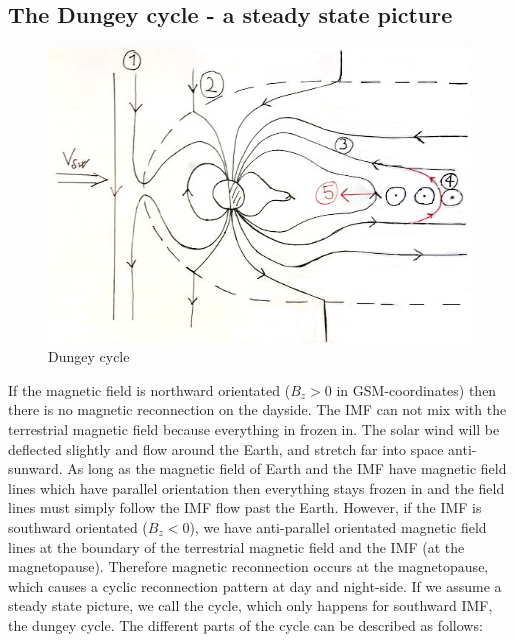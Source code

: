\documentclass[10pt,a4paper]{article}
\begin{document}
\subsection{The Dungey cycle - a steady state picture \label{_CHAP_THEO_Dungey cycle}}

\begin{figure}[h]
\centering
\caption{Dungey cycle}
\label{aurora substorm}
\includegraphics[scale=0.5]{solvind.jpg}
\end{figure}
If the magnetic field is northward orientated ($B_z>0$ in GSM-coordinates) then there is no magnetic reconnection on the dayside. 
The IMF can not mix with the terrestrial magnetic field because everything in frozen in. The solar wind will be deflected slightly and 
flow around the Earth, and stretch far into space anti-sunward. As long as the magnetic field of Earth and the IMF have magnetic field lines which have parallel orientation 
then everything stays frozen in and the field lines must simply follow the IMF flow past the Earth. However, if the IMF is southward orientated ($B_z<0$), 
we have anti-parallel orientated magnetic field lines at the boundary of the terrestrial magnetic field and the IMF (at the magnetopause). Therefore magnetic reconnection 
occurs at the magnetopause, which causes a cyclic reconnection pattern at day and night-side. If we assume a steady state picture, we call the cycle, which only happens for 
southward IMF, the dungey cycle. The different parts of the cycle can be described as follows:
\end{document}
